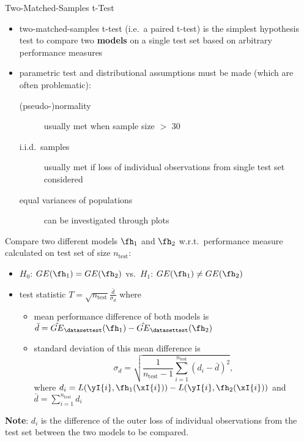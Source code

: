     \begin{frame}[c,allowframebreaks]{Two-Matched-Samples t-Test}

        \begin{itemize}
            \item two-matched-samples t-test (i.e.\ a paired t-test) is the simplest
                hypothesis test to compare two \textbf{models} on a single
                test set based on arbitrary performance measures
            \item parametric test and distributional assumptions must be made
                (which are often problematic):
                \begin{description}
                \item[(pseudo-)normality] usually met when sample size $>$ 30
                \item[i.i.d.\ samples] usually met if loss of individual observations from single test set considered
                \item[equal variances of populations] can be investigated through plots
                \end{description}
        \end{itemize}

    \framebreak

    Compare two different models $\fh_1$ and $\fh_2$ w.r.t.\ performance measure calculated on test set of size $n_{\text{test}}$:

    \begin{itemize}
    \item $H_0$: $GE(\fh_{1}) = GE(\fh_{2})$ vs.\ $H_1$: $GE(\fh_{1}) \neq GE(\fh_{2})$
    \item test statistic $T = \sqrt{n_{\text{test}}}
        \frac{\bar{d}}{\sigma_{d}}$ where
    \begin{itemize}
    \item mean performance difference of both models is
        $\bar{d} = \hat{GE}_{\datasettest}(\fh_{1}) - \hat{GE}_{\datasettest}(\fh_{2})$
    \item standard deviation of this mean difference is
    $$\sigma_{d} = \sqrt{\frac{1}{n_{\text{test}} - 1}\sum_{i=1}^{n_{\text{test}}} \left(d_i - \bar{d} \right)^2},$$
    where $d_i = L(\yI{i}, \fh_1 (\xI{i})) - L(\yI{i}, \fh_2 (\xI{i}))$ and $\bar{d} = \sum\limits_{i=1}^{n_{\text{test}}} d_i$
    \end{itemize}
    \end{itemize}

    \textbf{Note}: $d_i$ is the difference of the outer loss of individual observations from the test set between the two models to be compared.


\end{frame}
